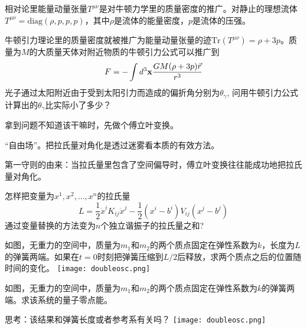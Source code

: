 \documentclass[CJK]{beamer}
\begin{document}
\begin{frame}
\bch
相对论里能量动量张量$T^{\mu\nu}$是对牛顿力学里的质量密度的推广。对静止的理想流体$T^{\mu\nu} = \mathrm{diag}(\rho, p, p, p)$，其中$\rho$是流体的能量密度，$p$是流体的压强。

牛顿引力理论里的质量密度就被推广为能量动量张量的迹$\mathrm{Tr}(T^{\mu\nu}) = \rho + 3p$。质量为$M$的大质量天体对附近物质的牛顿引力公式可以推广到
$$ F = - \int d^3{\mathbf{x}} \frac{GM(\rho + 3p) \vec{r}}{r^3}$$
光子通过太阳附近由于受到太阳引力而造成的偏折角分别为$\theta_\gamma$, 问用牛顿引力公式计算出的$\theta_\gamma$比实际小了多少？

\ech
\end{frame}

\begin{frame}
\bch
拿到问题不知道该干嘛时，先做个傅立叶变换。
\ech
\end{frame}

\begin{frame}
\bch

{“自由场”。把拉氏量对角化是透过迷雾看本质的有效方法。

\skipline
 第一守则的由来：当拉氏量里包含了空间偏导时，傅立叶变换往往能成功地把拉氏量对角化。}

\ech
\end{frame}

\begin{frame}
\bch
怎样把变量为$x^1, x^2,\ldots, x^n$的拉氏量
$$L = \frac{1}{2} \dot{x}^i K_{ij}\dot{x}^j - \frac{1}{2} (x^i-b^i) V_{ij} (x^j - b^j)$$
通过变量替换的方法变为$n$个独立谐振子的拉氏量之和? 
\ech
\end{frame}


\begin{frame}
\bch
{}
如图，无重力的空间中，质量为$m_1$和$m_2$的两个质点固定在弹性系数为$k$，长度为$L$的弹簧两端。如果在$t=0$时刻把弹簧压缩到$L/2$后释放，求两个质点之后的位置随时间的变化。
\emini
{}
\texttt{[image: doubleosc.png]}
\emini
\ech
\end{frame}


\begin{frame}
\bch
{}
如图，无重力的空间中，质量为$m_1$和$m_2$的两个质点固定在弹性系数为$k$的弹簧两端。求该系统的量子零点能。

\skipline
思考：该结果和弹簧长度或者参考系有关吗？
\emini
{}
\texttt{[image: doubleosc.png]}
\emini
\ech
\end{frame}
\end{document}
